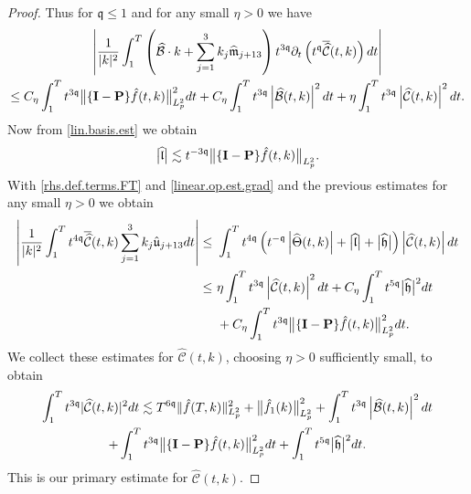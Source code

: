 \documentclass[10pt,a4paper]{amsart}
\newcommand{\highG}{\Theta}
\newcommand{\micro}{{\bf \{I- P\}}}
\def\norm#1{\big\Vert#1\big\Vert}
\newcommand{\pv}{p}
\newcommand{\qq}{\mathfrak{q}}
\newcommand{\tTq}{t^{3\qq}}
\newcommand{\tmTq}{t^{-3\qq}}
\newcommand{\tmq}{t^{-\qq}}
\newcommand{\tq}{t^{\qq}}
\begin{document}
\begin{proof}
Thus for $\qq \leq 1$ and for any small $\eta>0$ we have
\begin{multline*}
    \left|
\frac{1}{|k|^2} \int_1^{T} \left( \widehat{\mathcal{B}}\cdot k +\sum_{j=1}^3 k_j    \widehat{\mathfrak{m}}_{j+13} \right) \tTq\partial_t  \left(\tq\overline{\widehat{\mathcal{C}}}(t,k)\right) dt
\right|
\\
\leq
C_\eta\int_1^{T} \tTq\norm{\micro \hat{f}(t,k)}_{L^2_{\pv}}^2dt
+
C_\eta \int^{T}_{1} \tTq \left|\widehat{{\mathcal{B}}}(t,k)\right|^2 dt 
+
\eta \int^{T}_{1} \tTq \left|\widehat{\mathcal{C}}(t,k)\right|^2 dt. 
\end{multline*}
Now from \eqref{lin.basis.est} we obtain
\begin{align}\label{linear.op.est.grad}
\big| \widehat{\mathfrak{l}}\big|
 \lesssim 
 \tmTq
\norm{\micro \hat{f}(t,k)}_{L^2_{\pv}}.
\end{align}
With \eqref{rhs.def.terms.FT} and \eqref{linear.op.est.grad} and the previous estimates for any small $\eta>0$ we obtain
\begin{align*}
\left|  \frac{1}{|k|^2} \int_1^{T}t^{4\qq}\overline{\widehat{\mathcal{C}}}(t,k)  \sum_{j=1}^3 k_j\hat{\mathfrak{u}}_{j+13} dt
 \right|
 \leq &~
\int_1^{T}
 t^{4\qq}\left( \tmq\left|\widehat{\highG}(t,k)\right|+\big| \widehat{\mathfrak{l}}\big|+\big| \widehat{\mathfrak{h}}\big|\right) \left|\widehat{{\mathcal{C}}}(t,k)\right| dt
 \\
  \leq &~
  \eta \int^{T}_{1} \tTq  \left|\widehat{{\mathcal{C}}}(t,k)\right|^2 dt
  +C_\eta\int_1^{T} t^{5\qq}\big| \widehat{\mathfrak{h}}\big|^2dt
  \\
&~
+C_\eta\int_1^{T} \tTq\norm{\micro \hat{f}(t,k)}_{L^2_{\pv}}^2dt.
\end{align*}
We collect these estimates for $\widehat{\mathcal{C}}(t,k)$, choosing $\eta>0$ sufficiently small, to obtain
\begin{multline}\label{FT.C.estimate}
\int_1^{T} \tTq|\widehat{\mathcal{C}}(t,k)|^2  dt
\lesssim
 T^{6\qq}\Vert \hat{f}(T,k)\Vert_{L^2_{\pv}}^2+\norm{ \hat{f}_1(k)}_{L^2_{\pv}}^2
  +
\int^{T}_{1} \tTq \left|\widehat{{\mathcal{B}}}(t,k)\right|^2 dt 
 \\
+\int_1^{T} \tTq\norm{\micro \hat{f}(t,k)}_{L^2_{\pv}}^2dt
+\int_1^{T} t^{5\qq}\big| \widehat{\mathfrak{h}}\big|^2dt.
\end{multline}
This is our primary estimate for $\widehat{\mathcal{C}}(t,k)$.




\end{proof}
\end{document}
